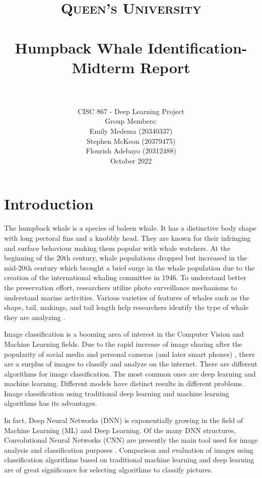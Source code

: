\documentclass[paper=a4, fontsize=11pt]{scrartcl}
\title{
		\usefont{OT1}{bch}{b}{n}
		\normalfont \normalsize \textsc{Queen's University} \\ [25pt]
		\horrule{0.5pt} \\[0.4cm]
		\huge Humpback Whale Identification- Midterm Report \\
		\horrule{2pt} \\[0.5cm]
}
\author{
    \normalfont 
      CISC 867 - Deep Learning Project \\
    \normalfont
    Group Members: \\ 
    \normalsize
    Emily Medema (20340337) \\ 
    \normalsize
    Stephen McKeon (20379475) \\ 
    \normalsize
    Flourish Adebayo (20312488) \\
    October 2022 \\ [3pt]}
\date{\vspace{-5ex}}
\numberwithin{equation}{section}		%
\numberwithin{table}{section}				%
\begin{document}
\maketitle



\newpage 

\section*{Introduction}\label{sec: intro}
The humpback whale is a species of baleen whale. It has a distinctive body shape with long pectoral fins and a knobbly head. They are known for their infringing and surface behaviour making them popular with whale watchers\cite{kareiva2006whales}. At the beginning of the 20th century, whale populations dropped but increased in the mid-20th century which brought a brief surge in the whale population due to the creation of the international whaling committee in 1946\cite{henderson2022behavior}. To understand better the preservation effort, researchers utilize photo surveillance mechanisms to understand marine activities. Various varieties of features of whales such as the shape, tail, makings, and tail length help researchers identify the type of whale they are analyzing \cite{JaisakthiS.M.2017Awms}. 

Image classification is a booming area of interest in the Computer Vision and Machine Learning fields. Due to the rapid increase of image sharing after the popularity of social media and personal cameras (and later smart phones) \cite{jain2000statistical}, there are a surplus of images to classify and analyze on the internet. There are different algorithms for image classification. The most common ones are deep learning and machine learning. Different models have distinct results in different problems. Image classification using traditional deep learning and machine learning algorithms has its advantages. 


In fact, Deep Neural Networks (DNN) is exponentially growing in the field of Machine Learning (ML) and Deep Learning. Of the many DNN structures, Convolutional Neural Networks (CNN) are presently the main tool used for image analysis and classification purposes \cite{jain2000statistical}. Comparison and evaluation of images using classification algorithms based on traditional machine learning and deep learning are of great significance for selecting algorithms to classify pictures. 
\end{document}
